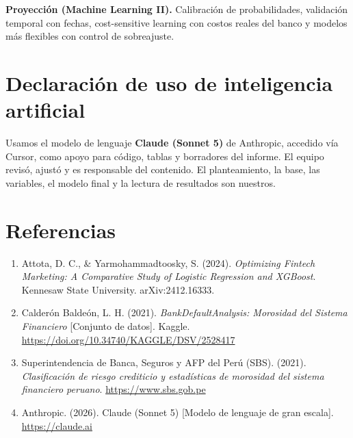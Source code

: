 \documentclass[11pt]{article}
\begin{document}
\textbf{Proyección (Machine Learning II).} Calibración de probabilidades, validación temporal con fechas, cost-sensitive learning con costos reales del banco y modelos más flexibles con control de sobreajuste.

\section*{Declaración de uso de inteligencia artificial}

Usamos el modelo de lenguaje \textbf{Claude (Sonnet 5)} de Anthropic, accedido vía Cursor, como apoyo para código, tablas y borradores del informe. El equipo revisó, ajustó y es responsable del contenido. El planteamiento, la base, las variables, el modelo final y la lectura de resultados son nuestros.

\section*{Referencias}

\begin{enumerate}[leftmargin=1.6em]
\item Attota, D. C., \& Yarmohammadtoosky, S. (2024). \textit{Optimizing Fintech Marketing: A Comparative Study of Logistic Regression and XGBoost}. Kennesaw State University. arXiv:2412.16333.
\item Calderón Baldeón, L. H. (2021). \textit{BankDefaultAnalysis: Morosidad del Sistema Financiero} [Conjunto de datos]. Kaggle. \url{https://doi.org/10.34740/KAGGLE/DSV/2528417}
\item Superintendencia de Banca, Seguros y AFP del Perú (SBS). (2021). \textit{Clasificación de riesgo crediticio y estadísticas de morosidad del sistema financiero peruano}. \url{https://www.sbs.gob.pe}
\item Anthropic. (2026). Claude (Sonnet 5) [Modelo de lenguaje de gran escala]. \url{https://claude.ai}
\end{enumerate}
\end{document}
